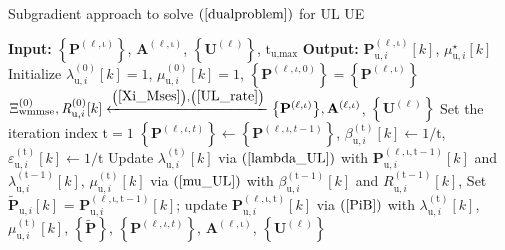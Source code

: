 \documentclass[9pt,journal]{IEEEtran}
\newcommand{\paren}[1]{\left({#1}\right)}
\newcommand{\bracket}[1]{{\left [{#1}\right ]}}
\newcommand{\braces}[1]{{\left\{ {#1}\right\}}}
\newcommand{\sfrac}[2]{#1/#2}
\theoremstyle{definition}
\begin{document}
\begin{algorithm}[ht!]
\caption{Subgradient approach to solve $\paren{\ref{dualproblem}}$ for UL UE}
\label{ULalgorithm}
\begin{algorithmic}[1]
\Statex \textbf{Input: } $\braces{\mathbf{P}^{\paren{\mathrm{\ell,\iota}}}}$,  $\mathbf{A}^{\paren{\mathrm{\ell,\iota}}}$, $\braces{\mathbf{U}^{\paren{\mathrm{\ell}}}}$, $\mathrm{t}_{\textrm{u,max}}$
\Statex \textbf{Output:} $\mathbf{P}^{\paren{\mathrm{\ell,\iota}}}_{\textrm{u},i}\bracket{k}$, $\mu^\star_{\textrm{u},i}\bracket{k}$
\State Initialize $\lambda^{\paren{\mathrm{0}}}_{\textrm{u},i}\bracket{k}=1$, $\mu^{\paren{\mathrm{0}}}_{\textrm{u},i}\bracket{k}=1$, $\braces{\mathbf{P}^{\paren{\ell,\iota,0}}}=\braces{\mathbf{P}^{\paren{\mathrm{\ell,\iota}}}}$ 
\State $\Xi^{\paren{\mathrm{0}}}_{\textrm{wmmse}},\mathit{R}^{\paren{\mathrm{0}}}_{\textrm{u},i}\bracket{k}\xleftarrow{\paren{\mathrm{\ref{Xi_Mses}}},\paren{\mathrm{\ref{UL_rate}}}}\braces{\mathbf{P}^{\paren{\mathrm{\ell,\iota}}}},\mathbf{A}^{\paren{\mathrm{\ell,\iota}}}$, $\braces{\mathbf{U}^{\paren{\mathrm{\ell}}}}$
\State Set the iteration index $\mathrm{t}=1$
\Repeat
\State $\braces{\mathbf{P}^{\paren{\ell,\iota,t}}}\leftarrow\braces{\mathbf{P}^{\paren{\ell,\iota,t-1}}}$, $\beta^{\paren{\mathrm{t}}}_{\textrm{u},i}\bracket{k}\leftarrow\sfrac{1}{\mathrm{t}}$, $\varepsilon^{\paren{\mathrm{t}}}_{\textrm{u},i}\bracket{k}\leftarrow\sfrac{1}{\mathrm{t}}$
\State Update $\lambda^{\paren{\mathrm{t}}}_{\textrm{u},i}\bracket{k}$ via $\mathrm{\paren{\ref{lambda_UL}}}$ with $\mathbf{P}^{\paren{\mathrm{\ell,\iota,t-1}}}_{\textrm{u},i}\bracket{k}$ and $\lambda^{\paren{\mathrm{t-1}}}_{\textrm{u},i}\bracket{k}$, $\mu^{\paren{\mathrm{t}}}_{\textrm{u},i}\bracket{k}$ via $\mathrm{\paren{\ref{mu_UL}}}$ with $\beta^{\paren{\mathrm{t-1}}}_{\textrm{u},i}\bracket{k}$ and $\mathit{R}^{\paren{\mathrm{t-1}}}_{\textrm{u},i}\bracket{k}$, 
\State Set $\widetilde{\mathbf{P}}_{\textrm{u},i}\bracket{k}$ = $\mathbf{P}^{\paren{\mathrm{\ell,\iota,t-1}}}_{\textrm{u},i}\bracket{k}$; update $\mathbf{P}^{\paren{\mathrm{\ell,\iota,t}}}_{\textrm{u},i}\bracket{k}$ via $\mathrm{\paren{\ref{PiB}}}$ with $\lambda^{\paren{\mathrm{t}}}_{\textrm{u},i}\bracket{k}$, $\mu^{\paren{\mathrm{t}}}_{\textrm{u},i}\bracket{k}$, $\braces{\widetilde{\mathbf{P}}}$, $\braces{\mathbf{P}^{\paren{\ell,\iota,t}}}$, $\mathbf{A}^{\paren{\mathrm{\ell,\iota}}}$, $\braces{\mathbf{U}^{\paren{\mathrm{\ell}}}}$

\end{algorithmic}
\end{algorithm}
\end{document}
